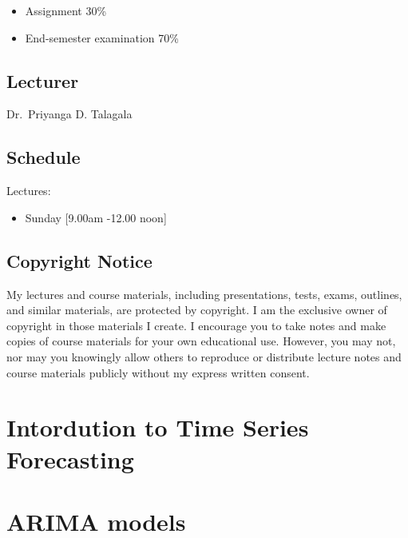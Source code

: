 \documentclass[]{book}
\providecommand{\tightlist}{%
  \setlength{\itemsep}{0pt}\setlength{\parskip}{0pt}}
\begin{document}
\begin{itemize}
\tightlist
\item
  Assignment 30\%
\item
  End-semester examination 70\%
\end{itemize}

\hypertarget{lecturer}{%
\section*{Lecturer}\label{lecturer}}

Dr.~Priyanga D. Talagala

\hypertarget{schedule}{%
\section*{Schedule}\label{schedule}}

Lectures:

\begin{itemize}
\tightlist
\item
  Sunday {[}9.00am -12.00 noon{]}
\end{itemize}

\hypertarget{copyright-notice}{%
\section*{Copyright Notice}\label{copyright-notice}}

My lectures and course materials, including presentations, tests, exams, outlines, and similar materials, are protected by copyright. I am the exclusive owner of copyright in those materials I create. I encourage you to take notes and make copies of course materials for your own educational use. However, you may not, nor may you knowingly allow others to reproduce or distribute lecture notes and course materials publicly without my express written consent.

\hypertarget{intro}{%
\chapter{Intordution to Time Series Forecasting}\label{intro}}

\hypertarget{arima-models}{%
\chapter{ARIMA models}\label{arima-models}}
\end{document}
